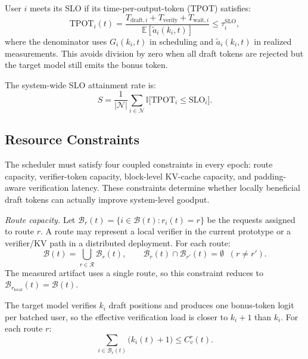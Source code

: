 \documentclass[journal]{IEEEtran}
\newcommand{\ind}{\mathbb{I}}
\begin{document}
User $i$ meets its SLO if its time-per-output-token 
(TPOT) satisfies:
\begin{equation}
    \label{eq:slo}
    \text{TPOT}_i(t) = 
    \frac{T_{\text{draft},i} + T_{\text{verify}} + 
    T_{\text{wait},i}}{\mathbb{E}[\tilde{a}_i(k_i,t)]} 
    \leq \tau_i^{\text{SLO}},
\end{equation}
where the denominator uses $G_i(k_i,t)$ in scheduling 
and $\tilde{a}_i(k_i,t)$ in realized measurements. 
This avoids division by zero when all draft tokens are 
rejected but the target model still emits the bonus token.

The system-wide SLO attainment rate is:
\begin{equation}
    \label{eq:slo-attainment}
    S = \frac{1}{|\mathcal{N}|} \sum_{i \in \mathcal{N}} 
    \ind\bigl[\text{TPOT}_i \leq \text{SLO}_i\bigr].
\end{equation}

\subsection{Resource Constraints}
\label{sec:model-constraints}

The scheduler must satisfy four coupled constraints in every 
epoch: route capacity, verifier-token capacity, block-level KV-cache
capacity, and padding-aware verification latency. These constraints
determine whether locally beneficial draft tokens can actually 
improve system-level goodput.

\textit{Route capacity.}
Let $\mathcal{B}_r(t)=\{i\in\mathcal{B}(t):r_i(t)=r\}$ be the requests
assigned to route $r$. A route may represent a local verifier in the
current prototype or a verifier/KV path in a distributed deployment.
For each route:
\begin{equation}
    \label{eq:route-capacity}
    \mathcal{B}(t) = \bigcup_{r\in\mathcal{R}}\mathcal{B}_r(t),
    \qquad
    \mathcal{B}_r(t)\cap\mathcal{B}_{r'}(t)=\emptyset
    \;\; (r\neq r').
\end{equation}
The measured artifact uses a single route, so this constraint reduces
to $\mathcal{B}_{r_{\mathrm{local}}}(t)=\mathcal{B}(t)$.

The target model verifies $k_i$ draft positions and 
produces one bonus-token logit per batched user, so the 
effective verification load is closer to $k_i{+}1$ than 
$k_i$. For each route $r$:
\begin{equation}
    \label{eq:compute-constraint}
    \sum_{i \in \mathcal{B}_r(t)} \bigl(k_i(t)+1\bigr)
    \leq C_v^r(t).
\end{equation}
\end{document}
